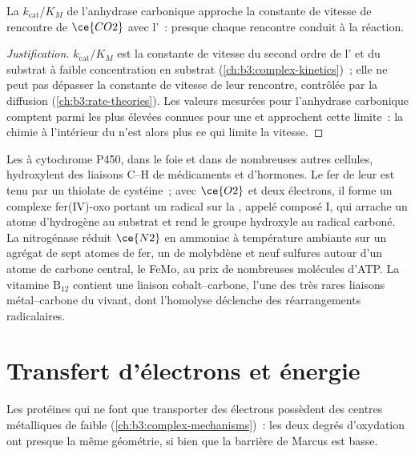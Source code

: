 \begin{proposition}\label{prop:b3:bioinorganic:carbonic-anhydrase}
La  $k_{\mathrm{cat}}/K_M$ de l'anhydrase carbonique approche la constante
de vitesse de rencontre de $\ce{CO2}$ avec l'~: presque chaque rencontre conduit à
la réaction.
\end{proposition}

\begin{proof}[Justification]
$k_{\mathrm{cat}}/K_M$ est la constante de vitesse du second ordre de l' et du substrat à faible
concentration en substrat (\cref{ch:b3:complex-kinetics})~; elle ne peut pas
dépasser la constante de vitesse de leur rencontre, contrôlée par la
diffusion (\cref{ch:b3:rate-theories}). Les valeurs mesurées pour
l'anhydrase carbonique comptent parmi les plus élevées connues pour une
 et approchent cette limite~: la chimie à l'intérieur du 
n'est alors plus ce qui limite la vitesse.
\end{proof}

Les  à cytochrome P450, dans le foie et dans de nombreuses autres
cellules, hydroxylent des liaisons C--H de médicaments et d'hormones. Le fer
de leur  est tenu par un thiolate de cystéine~; avec
$\ce{O2}$ et deux électrons, il forme un complexe fer(IV)-oxo portant un radical sur la
, appelé composé I, qui arrache un atome d'hydrogène au substrat
et rend le groupe hydroxyle au radical carboné. La nitrogénase réduit
$\ce{N2}$ en ammoniac à température ambiante sur un agrégat de sept atomes de fer,
un de molybdène et neuf sulfures autour d'un atome de carbone central, le
 FeMo, au prix de nombreuses molécules d'ATP. La vitamine $\mathrm{B_{12}}$ contient une
liaison cobalt--carbone, l'une des très rares liaisons métal--carbone du
vivant, dont l'homolyse déclenche des réarrangements radicalaires.

\section{Transfert d'électrons et énergie}

Les protéines qui ne font que transporter des électrons possèdent des
centres métalliques de faible 
(\cref{ch:b3:complex-mechanisms})~: les deux degrés d'oxydation ont presque
la même géométrie, si bien que la barrière de Marcus est basse.

